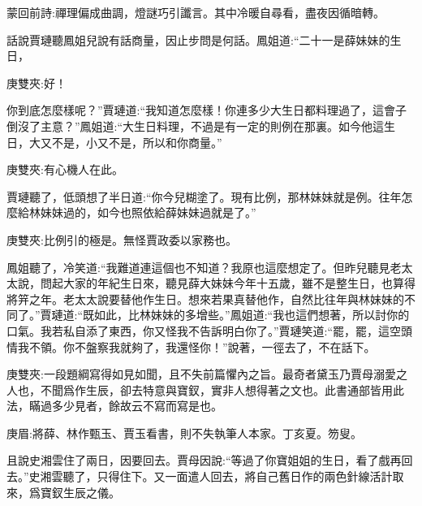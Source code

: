 
\begin{parag}
    \begin{note}蒙回前詩:禪理偏成曲調，燈謎巧引讖言。其中冷暖自尋看，盡夜因循暗轉。\end{note}
\end{parag}


\begin{parag}
    話說賈璉聽鳳姐兒說有話商量，因止步問是何話。鳳姐道:“二十一是薛妹妹的生日，\begin{note}庚雙夾:好！\end{note}你到底怎麼樣呢？”賈璉道:“我知道怎麼樣！你連多少大生日都料理過了，這會子倒沒了主意？”鳳姐道:“大生日料理，不過是有一定的則例在那裏。如今他這生日，大又不是，小又不是，所以和你商量。”\begin{note}庚雙夾:有心機人在此。\end{note}賈璉聽了，低頭想了半日道:“你今兒糊塗了。現有比例，那林妹妹就是例。往年怎麼給林妹妹過的，如今也照依給薛妹妹過就是了。”\begin{note}庚雙夾:比例引的極是。無怪賈政委以家務也。\end{note}鳳姐聽了，冷笑道:“我難道連這個也不知道？我原也這麼想定了。但昨兒聽見老太太說，問起大家的年紀生日來，聽見薛大妹妹今年十五歲，雖不是整生日，也算得將笄之年。老太太說要替他作生日。想來若果真替他作，自然比往年與林妹妹的不同了。”賈璉道:“既如此，比林妹妹的多增些。”鳳姐道:“我也這們想著，所以討你的口氣。我若私自添了東西，你又怪我不告訴明白你了。”賈璉笑道:“罷，罷，這空頭情我不領。你不盤察我就夠了，我還怪你！”說著，一徑去了，不在話下。\begin{note}庚雙夾:一段題綱寫得如見如聞，且不失前篇懼內之旨。最奇者黛玉乃賈母溺愛之人也，不聞爲作生辰，卻去特意與寶釵，實非人想得著之文也。此書通部皆用此法，瞞過多少見者，餘故云不寫而寫是也。\end{note}\begin{note}庚眉:將薛、林作甄玉、賈玉看書，則不失執筆人本家。丁亥夏。笏叟。\end{note}
\end{parag}


\begin{parag}
    且說史湘雲住了兩日，因要回去。賈母因說:“等過了你寶姐姐的生日，看了戲再回去。”史湘雲聽了，只得住下。又一面遣人回去，將自己舊日作的兩色針線活計取來，爲寶釵生辰之儀。
\end{parag}


